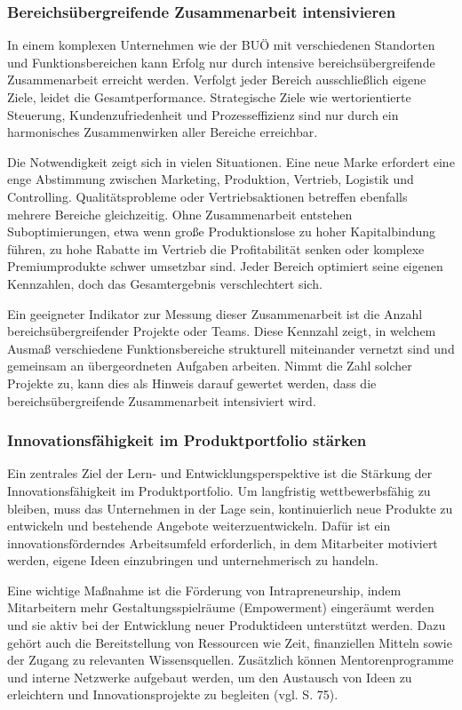 \subsubsection{Bereichsübergreifende Zusammenarbeit intensivieren}
In einem komplexen Unternehmen wie der BUÖ mit verschiedenen Standorten und Funktionsbereichen kann Erfolg nur durch intensive bereichsübergreifende Zusammenarbeit erreicht werden. Verfolgt jeder Bereich ausschließlich eigene Ziele, leidet die Gesamtperformance. Strategische Ziele wie wertorientierte Steuerung, Kundenzufriedenheit und Prozesseffizienz sind nur durch ein harmonisches Zusammenwirken aller Bereiche erreichbar.

Die Notwendigkeit zeigt sich in vielen Situationen. Eine neue Marke erfordert eine enge Abstimmung zwischen Marketing, Produktion, Vertrieb, Logistik und Controlling. Qualitätsprobleme oder Vertriebsaktionen betreffen ebenfalls mehrere Bereiche gleichzeitig. Ohne Zusammenarbeit entstehen Suboptimierungen, etwa wenn große Produktionslose zu hoher Kapitalbindung führen, zu hohe Rabatte im Vertrieb die Profitabilität senken oder komplexe Premiumprodukte schwer umsetzbar sind. Jeder Bereich optimiert seine eigenen Kennzahlen, doch das Gesamtergebnis verschlechtert sich.

Ein geeigneter Indikator zur Messung dieser Zusammenarbeit ist die Anzahl bereichsübergreifender Projekte oder Teams. Diese Kennzahl zeigt, in welchem Ausmaß verschiedene Funktionsbereiche strukturell miteinander vernetzt sind und gemeinsam an übergeordneten Aufgaben arbeiten. Nimmt die Zahl solcher Projekte zu, kann dies als Hinweis darauf gewertet werden, dass die bereichsübergreifende Zusammenarbeit intensiviert wird.

\subsubsection{Innovationsfähigkeit im Produktportfolio stärken}
Ein zentrales Ziel der Lern- und Entwicklungsperspektive ist die Stärkung der Innovationsfähigkeit im Produktportfolio. Um langfristig wettbewerbsfähig zu bleiben, muss das Unternehmen in der Lage sein, kontinuierlich neue Produkte zu entwickeln und bestehende Angebote weiterzuentwickeln. Dafür ist ein innovationsförderndes Arbeitsumfeld erforderlich, in dem Mitarbeiter motiviert werden, eigene Ideen einzubringen und unternehmerisch zu handeln.

Eine wichtige Maßnahme ist die Förderung von Intrapreneurship, indem Mitarbeitern mehr Gestaltungsspielräume (Empowerment) eingeräumt werden und sie aktiv bei der Entwicklung neuer Produktideen unterstützt werden. Dazu gehört auch die Bereitstellung von Ressourcen wie Zeit, finanziellen Mitteln sowie der Zugang zu relevanten Wissensquellen. Zusätzlich können Mentorenprogramme und interne Netzwerke aufgebaut werden, um den Austausch von Ideen zu erleichtern und Innovationsprojekte zu begleiten (vgl. \cite{kollinger_intrapreneurship_2023} S. 75).

